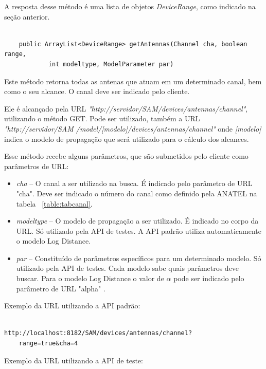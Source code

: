 A resposta desse método é uma lista de objetos \textit{DeviceRange}, como indicado na seção anterior.

\begin{lstlisting}

	public ArrayList<DeviceRange> getAntennas(Channel cha, boolean range, 
			int modeltype, ModelParameter par)

\end{lstlisting}

Este método retorna todas as antenas que atuam em um determinado canal, bem como o seu alcance. O canal deve ser indicado pelo cliente.

Ele é alcançado pela URL \textit{"http://servidor/SAM/devices/antennas/channel"}, utilizando o método GET. Pode ser utilizado, também a URL \textit{"http://servidor/SAM /model/[modelo]/devices/antennas/channel"} onde \textit{[modelo]} indica o modelo de propagação que será utilizado para o cálculo dos alcances.

Esse método recebe alguns parâmetros, que são submetidos pelo cliente como parâmetros de URL:

\begin{itemize}
\item \textit{cha} --  O canal a ser utilizado na busca. É indicado pelo parâmetro de URL "cha". Deve ser indicado o número do canal como definido pela ANATEL na tabela ~\ref{table:tabcanal}.
\item \textit{modeltype} -- O modelo de propagação a ser utilizado. É indicado no corpo da URL. Só utilizado pela API de testes. A API padrão utiliza automaticamente o modelo Log Distance.
\item \textit{par} -- Constituído de parâmetros específicos para um determinado modelo. Só utilizado pela API de testes. Cada modelo sabe quais parâmetros deve buscar. Para o modelo Log Distance o valor de \begin{math} \alpha \end{math} pode ser indicado pelo parâmetro de URL "alpha" .
\end{itemize}

Exemplo da URL utilizando a API padrão:

\begin{lstlisting}	

http://localhost:8182/SAM/devices/antennas/channel?
	range=true&cha=4

\end{lstlisting}

Exemplo da URL utilizando a API de teste:

